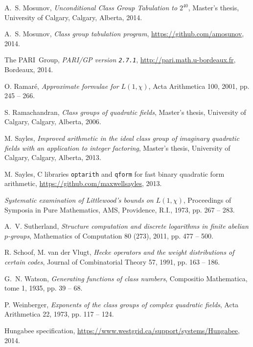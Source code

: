 \documentclass{mcom-l}
\theoremstyle{definition}
\begin{document}
\begin{thebibliography}{10}
A.~S. Mosunov,
\emph{Unconditional Class Group Tabulation to $2^{40}$},
Master's thesis, University of Calgary, Calgary, Alberta, 2014.

A.~S. Mosunov,
\emph{Class group tabulation program},
\url{https://github.com/amosunov}, 2014.

The PARI~Group,
\emph{PARI/GP version \texttt{2.7.1}},
\url{http://pari.math.u-bordeaux.fr}, Bordeaux, 2014.

O. Ramar\'e,
\emph{Approximate formulae for $L(1,\chi)$},
Acta Arithmetica 100, 2001, pp. 245 -- 266.

S. Ramachandran,
\emph{Class groups of quadratic fields},
Master's thesis, University of Calgary, Calgary, Alberta, 2006.

M. Sayles,
\emph{Improved arithmetic in the ideal class group of imaginary quadratic fields with an application to integer factoring},
Master's thesis, University of Calgary, Calgary, Alberta, 2013.

M. Sayles,
C libraries \texttt{optarith} and \texttt{qform} for fast binary quadratic form arithmetic,
\url{https://github.com/maxwellsayles}, 2013.

\emph{Systematic examination of Littlewood's bounds on $L(1,\chi)$},
Proceedings of Symposia in Pure Mathematics, AMS, Providence, R.I., 1973, pp. 267 -- 283.

A.~V. Sutherland,
\emph{Structure computation and discrete logarithms in finite abelian $p$-groups},
Mathematics of Computation 80 (273), 2011, pp. 477 -- 500.

R. Schoof, M. van der Vlugt,
\emph{Hecke operators and the weight distributions of certain codes},
Journal of Combinatorial Theory 57, 1991, pp. 163 -- 186.

G.~N. Watson,
\emph{Generating functions of class numbers},
Compositio Mathematica, tome 1, 1935, pp. 39 -- 68.

P. Weinberger,
\emph{Exponents of the class groups of complex quadratic fields},
Acta Arithmetica 22, 1973, pp. 117 -- 124.

Hungabee specification,
\url{https://www.westgrid.ca/support/systems/Hungabee}, 2014.
\end{thebibliography}
\end{document}
